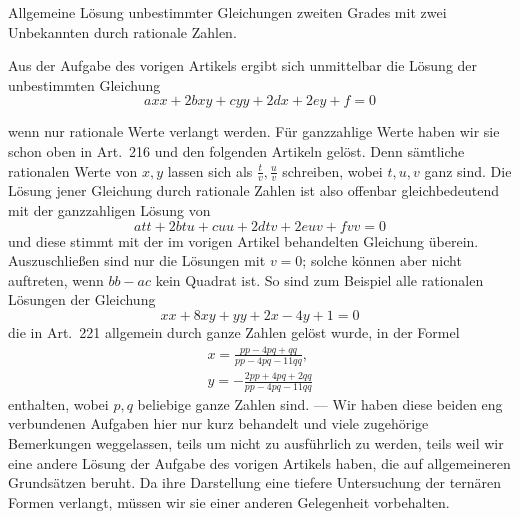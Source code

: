 \begin{center}Allgemeine Lösung unbestimmter Gleichungen zweiten Grades mit zwei Unbekannten durch rationale Zahlen.\end{center}


Aus der Aufgabe des vorigen Artikels ergibt sich unmittelbar die Lösung der unbestimmten Gleichung
\[axx+2bxy+cyy+2dx+2ey+f=0\]

wenn nur rationale Werte verlangt werden. Für ganzzahlige Werte haben wir sie schon oben in Art.\ 216 und den folgenden Artikeln gelöst. Denn sämtliche rationalen Werte von \(x,y\) lassen sich als \(\frac{t}{v},\frac{u}{v}\) schreiben, wobei \(t,u,v\) ganz sind. Die Lösung jener Gleichung durch rationale Zahlen ist also offenbar gleichbedeutend mit der ganzzahligen Lösung von
\[att+2btu+cuu+2dtv+2euv+fvv=0\]
und diese stimmt mit der im vorigen Artikel behandelten Gleichung überein. Auszuschließen sind nur die Lösungen mit \(v=0\); solche können aber nicht auftreten, wenn \(bb-ac\) kein Quadrat ist. So sind zum Beispiel alle rationalen Lösungen der Gleichung
\[xx+8xy+yy+2x-4y+1=0\]
die in Art.\ 221 allgemein durch ganze Zahlen gelöst wurde, in der Formel
\[\begin{gathered}x=\frac{pp-4pq+qq}{pp-4pq-11qq},\\ y=-\frac{2pp+4pq+2qq}{pp-4pq-11qq}\end{gathered}\]
enthalten, wobei \(p,q\) beliebige ganze Zahlen sind. — Wir haben diese beiden eng verbundenen Aufgaben hier nur kurz behandelt und viele zugehörige Bemerkungen weggelassen, teils um nicht zu ausführlich zu werden, teils weil wir eine andere Lösung der Aufgabe des vorigen Artikels haben, die auf allgemeineren Grundsätzen beruht. Da ihre Darstellung eine tiefere Untersuchung der ternären Formen verlangt, müssen wir sie einer anderen Gelegenheit vorbehalten.
